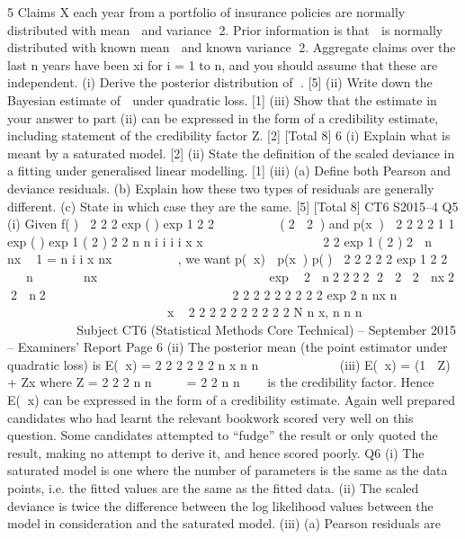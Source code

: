 5 Claims X each year from a portfolio of insurance policies are normally distributed
with mean  and variance 2. Prior information is that  is normally distributed with
known mean  and known variance 2.
Aggregate claims over the last n years have been xi for i = 1 to n, and you should
assume that these are independent.
(i) Derive the posterior distribution of . [5]
(ii) Write down the Bayesian estimate of  under quadratic loss. [1]
(iii) Show that the estimate in your answer to part (ii) can be expressed in the
form of a credibility estimate, including statement of the credibility factor Z.
[2]
[Total 8]
6 (i) Explain what is meant by a saturated model. [2]
(ii) State the definition of the scaled deviance in a fitting under generalised
linear modelling. [1]
(iii) (a) Define both Pearson and deviance residuals.
(b) Explain how these two types of residuals are generally different.
(c) State in which case they are the same. [5]
[Total 8]
CT6 S2015–4
Q5 (i) Given
f() 
2
2 2
exp ( ) exp 1
2 2
  
  
 
(2  2)
and
p(x) 
2
2
2 2
1 1
exp ( ) exp 1 ( 2 )
2 2
n n
i
i
i i
x x
 
 
     
   
 2
2
exp 1 ( 2 )
2
 n  nx

1
=
  n
i
i
x nx

 
 
 
 ,
we want
p(x)  p(x) p()
 2
2 2 2 2
exp 1
2 2
   n       nx                  
 exp  2  n2
222 2  2 2  nx2
2  n2

 

 

 

 








2 2 2 2 2
2 2 2 2 exp
2
n nx
n
              
        
 x ~
  2 2 2 2
2 2 2 2 2 2 N n x,
n n n
     
   
          
Subject CT6 (Statistical Methods Core Technical) – September 2015 – Examiners’ Report
Page 6
(ii) The posterior mean (the point estimator under quadratic loss) is
E(x) =
  2 2
2 2 2 2
n x
n n
 
 
     
(iii) E(x) = (1  Z)  + Zx
where
Z =
  2
2 2
n
n

  
= 2
2
n
n 


is the credibility factor. Hence E(x) can be expressed in the form of a
credibility estimate.
Again well prepared candidates who had learnt the relevant bookwork scored
very well on this question. Some candidates attempted to “fudge” the result or
only quoted the result, making no attempt to derive it, and hence scored
poorly.
Q6 (i) The saturated model is one where the number of parameters is the same as the
data points,
i.e. the fitted values are the same as the fitted data.
(ii) The scaled deviance is twice the difference between the log likelihood values
between the model in consideration and the saturated model.
(iii) (a) Pearson residuals are
